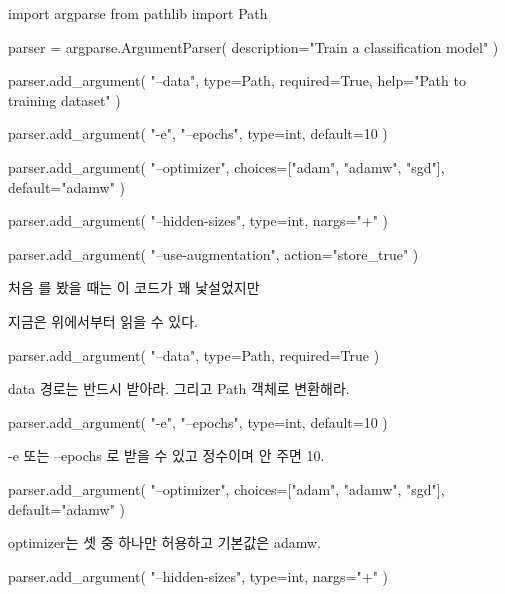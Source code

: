 \begin{dhkcode}
import argparse
from pathlib import Path

parser = argparse.ArgumentParser(
    description="Train a classification model"
)

parser.add_argument(
    "--data",
    type=Path,
    required=True,
    help="Path to training dataset"
)

parser.add_argument(
    "-e",
    "--epochs",
    type=int,
    default=10
)

parser.add_argument(
    "--optimizer",
    choices=["adam", "adamw", "sgd"],
    default="adamw"
)

parser.add_argument(
    "--hidden-sizes",
    type=int,
    nargs="+"
)

parser.add_argument(
    "--use-augmentation",
    action="store_true"
)
\end{dhkcode}

처음 를 봤을 때는 이 코드가 꽤 낯설었지만

지금은 위에서부터 읽을 수 있다.

\begin{dhkcode}
parser.add_argument(
    "--data",
    type=Path,
    required=True
)
\end{dhkcode}

\begin{dhksmry}[centered]
data 경로는 반드시 받아라. 그리고 Path 객체로 변환해라.
\end{dhksmry}

\begin{dhkcode}
parser.add_argument(
    "-e",
    "--epochs",
    type=int,
    default=10
)
\end{dhkcode}

\begin{dhksmry}[centered]
-e 또는 --epochs 로 받을 수 있고 정수이며 안 주면 10.
\end{dhksmry}

\begin{dhkcode}
parser.add_argument(
    "--optimizer",
    choices=["adam", "adamw", "sgd"],
    default="adamw"
)
\end{dhkcode}

\begin{dhksmry}[centered]
optimizer는 셋 중 하나만 허용하고 기본값은 adamw. 
\end{dhksmry}

\begin{dhkcode}
parser.add_argument(
    "--hidden-sizes",
    type=int,
    nargs="+"
)
\end{dhkcode}

